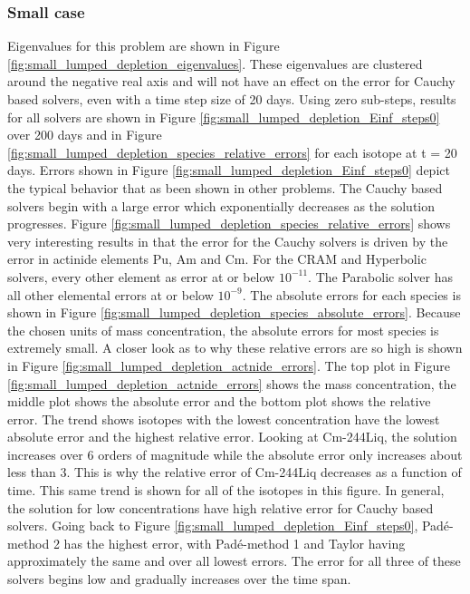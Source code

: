 \subsubsection{Small case}
Eigenvalues for this problem are shown in Figure \ref{fig:small_lumped_depletion_eigenvalues}. These eigenvalues are clustered around the negative real axis and will not have an effect on the error for Cauchy based solvers, even with a time step size of 20 days. Using zero sub-steps, results for all solvers are shown in Figure \ref{fig:small_lumped_depletion_Einf_steps0} over 200 days and in Figure \ref{fig:small_lumped_depletion_species_relative_errors} for each isotope at t = 20 days. Errors shown in Figure \ref{fig:small_lumped_depletion_Einf_steps0} depict  the typical behavior that as been shown in other problems. The Cauchy based solvers begin with a large error which exponentially decreases as the solution progresses. Figure \ref{fig:small_lumped_depletion_species_relative_errors} shows very interesting results in that the error for the Cauchy solvers is driven by the error in actinide elements Pu, Am and Cm. For the CRAM and Hyperbolic solvers, every other element as error at or below $10^{-11}$. The Parabolic solver has all other elemental errors at or below $10^{-9}$. The absolute errors for each species is shown in Figure \ref{fig:small_lumped_depletion_species_absolute_errors}. Because the chosen units of mass concentration, the absolute errors for most species is extremely small.  A closer look as to why these relative errors are so high is shown in Figure \ref{fig:small_lumped_depletion_actnide_errors}. The top plot in Figure \ref{fig:small_lumped_depletion_actnide_errors} shows the mass concentration, the middle plot shows the absolute error and the bottom plot shows the relative error. The trend shows isotopes with the lowest concentration have the lowest absolute error and the highest relative error. Looking at Cm-244Liq, the solution increases over 6 orders of magnitude while the absolute error only increases about less than 3. This is why the relative error of Cm-244Liq decreases as a function of time. This same trend is shown for all of the isotopes in this figure. In general, the solution for low concentrations have high relative error for Cauchy based solvers. Going back to Figure \ref{fig:small_lumped_depletion_Einf_steps0}, Pad\'e-method 2 has the highest error, with Pad\'e-method 1 and Taylor having approximately the same and over all lowest errors. The error for all three of these solvers begins low and gradually increases over the time span. 

